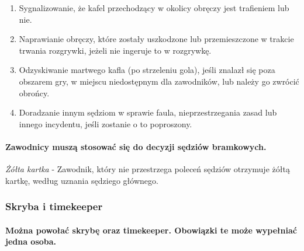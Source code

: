 \documentclass[12pt]{article}
\begin{document}
\begin{enumerate}
	\item Sygnalizowanie, że kafel przechodzący w okolicy obręczy jest
	      trafieniem lub nie.

	\item Naprawianie obręczy, które zostały uszkodzone lub przemieszczone w
	      trakcie trwania rozgrywki, jeżeli nie ingeruje to w rozgrywkę.

	\item Odzyskiwanie martwego kafla (po strzeleniu gola), jeśli znalazł się
	      poza obszarem gry, w miejscu niedostępnym dla zawodników, lub należy go
	      zwrócić obrońcy.

	\item Doradzanie innym sędziom w sprawie faula, nieprzestrzegania zasad lub
	      innego incydentu, jeśli zostanie o to poproszony.
\end{enumerate}

\paragraph{Zawodnicy muszą stosować się do decyzji sędziów
	bramkowych.}

\emph{Żółta kartka} - Zawodnik, który nie przestrzega poleceń sędziów
otrzymuje żółtą kartkę, według uznania sędziego głównego.

\subsubsection{Skryba i timekeeper}

\paragraph{Można powołać skrybę oraz timekeeper. Obowiązki te
	może wypełniać jedna osoba.}
\end{document}
